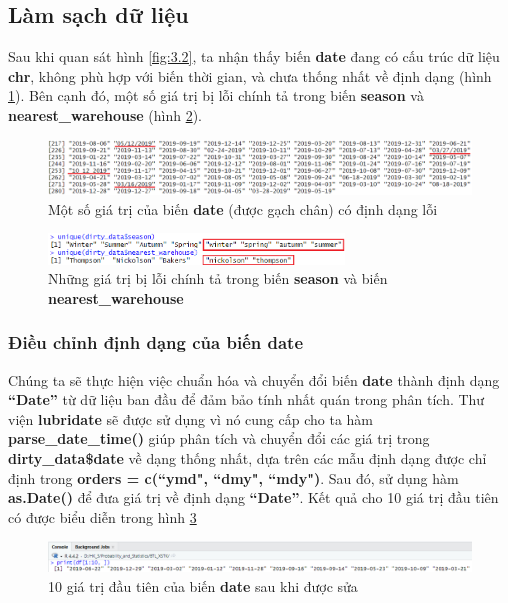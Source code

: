 \subsection{Làm sạch dữ liệu}
Sau khi quan sát hình \ref{fig:3.2}, ta nhận thấy biến \textbf{date} đang có cấu trúc dữ liệu \textbf{chr}, không phù hợp với biến thời gian, và chưa thống nhất về định dạng (hình \ref{fig:3.3}). Bên cạnh đó, một số giá trị bị lỗi chính tả trong biến \textbf{season} và \textbf{nearest\_warehouse} (hình \ref{fig:3.4}).
\begin{figure}[!htbp]
    \centering
    \includegraphics[width=1\textwidth]{graphics/Pre_processing_data/f10.PNG}
    \caption{Một số giá trị của biến \textbf{date} (được gạch chân) có định dạng lỗi}
    \label{fig:3.3}
\end{figure}

\begin{figure}[!htbp]
    \centering
    \includegraphics[width=0.7\textwidth]{graphics/Pre_processing_data/f11.PNG}
    \caption{Những giá trị bị lỗi chính tả trong biến \textbf{season} và biến \textbf{nearest\_warehouse}}
    \label{fig:3.4}
\end{figure}

\subsubsection{Điều chỉnh định dạng của biến date}
Chúng ta sẽ thực hiện việc chuẩn hóa và chuyển đổi biến \textbf{date} thành định dạng \textbf{``Date''} từ dữ liệu ban đầu để đảm bảo tính nhất quán trong phân tích. Thư viện \textbf{lubridate} sẽ được sử dụng vì nó cung cấp cho ta hàm \textbf{parse\_date\_time()} giúp phân tích và chuyển đổi các giá trị trong \textbf{dirty\_data\$date} về dạng thống nhất, dựa trên các mẫu định dạng được chỉ định trong \textbf{orders = c(``ymd", ``dmy", ``mdy")}. Sau đó, sử dụng hàm \textbf{as.Date()} để đưa giá trị về định dạng \textbf{``Date''}. Kết quả cho 10 giá trị đầu tiên có được biểu diễn trong hình \ref{f2}
\begin{figure}[!htbp]
    \centering
    \includegraphics[width=\textwidth]{graphics/Pre_processing_data/f2.PNG}
    \caption{10 giá trị đầu tiên của biến \textbf{date} sau khi được sửa}
    \label{f2}
\end{figure} 
